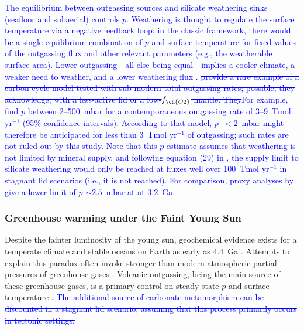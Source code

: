 \documentclass[3p,authoryear]{elsarticle}
\newcommand{\editthree}[2]{\textcolor{blue}{\sout{#1}#2}}
\begin{document}
\editthree{}{The equilibrium between outgassing sources and silicate weathering sinks (seafloor and subaerial) controls $p$\ch{CO2}. Weathering is thought to regulate the surface temperature via a negative feedback loop: in the classic \citet{Walker1981} framework, there would be a single equilibrium combination of $p$\ch{CO2} and surface temperature for fixed values of the outgassing flux and other relevant parameters (e.g., the weatherable surface area). Lower outgassing---all else being equal---implies a cooler climate, a weaker need to weather, and a lower \ch{CO2} weathering flux\editthree{}{ \citep[e.g.,][]{Kadoya2014, KT2018}}. \editthree{\citet{KT2018} provide a rare example of a carbon cycle model tested with sub-modern total \ch{CO2} outgassing rates; possible, they acknowledge, with a less-active lid or a low-$f_{\ch{O2}}$ mantle. They}{For example, \citet{KT2018}} find $p$\ch{CO2} between 2--500~mbar for a contemporaneous outgassing rate of 3--9~Tmol yr$^{-1}$ (95\% confidence intervals). According to that model, $p$\ch{CO2}~$< 2$~mbar might therefore be anticipated for less than 3~Tmol yr$^{-1}$ of outgassing; such rates are not ruled out by this study. Note that this $p$\ch{CO2} estimate assumes that weathering is not limited by mineral supply, and following equation (29) in \citet{Foley2018}, the supply limit to silicate weathering would only be reached at \ch{CO2} fluxes well over 100~Tmol yr$^{-1}$ in stagnant lid scenarios (i.e., it is not reached). For comparison, proxy analyses by \citet{Hessler2004} give a lower limit of $p$\ch{CO2} $\sim 2.5$~mbar at at 3.2~Ga.}






\subsubsection{Greenhouse warming under the Faint Young Sun}

Despite the fainter luminosity of the young sun, geochemical evidence exists for a temperate climate and stable oceans on Earth as early as 4.4~Ga \citep[e.g.,][]{Wilde2001, Valley2002, Valley2014}. Attempts to explain this paradox often invoke stronger-than-modern atmospheric partial pressures of greenhouse gases \citep[see review in][]{charnay2020}. Volcanic outgassing, being the main source of these greenhouse gases, is a primary control on steady-state $p$ and surface temperature \citep[e.g.,][]{Walker1981, Sleep2001, Kadoya2014, Honing2019}. \editthree{The additional source of carbonate metamorphism can be discounted in a stagnant lid scenario, assuming that this process primarily occurs in tectonic settings.}{} 
\end{document}
